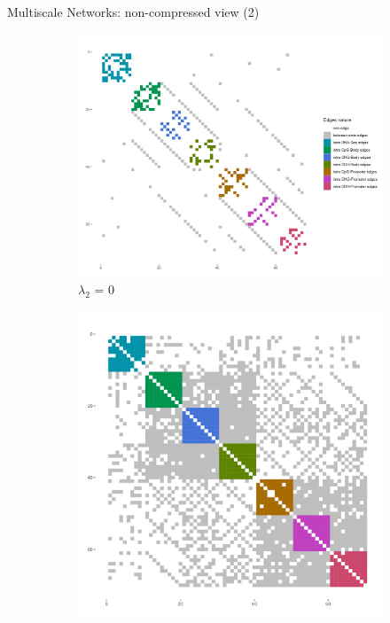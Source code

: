 \documentclass[11pt]{beamer}
\begin{document}
\begin{frame}{Multiscale Networks: non-compressed view (2)}
\begin{figure}
\centering
\begin{subfigure}{0.4\linewidth}
\centering
\includegraphics[scale = 0.14]{images/colored-adj_mat_mglasso_genot1_order_omic.png}
\caption{$\lambda_2$ = 0}
\end{subfigure}
\hfill
\begin{subfigure}{0.4\linewidth}
\centering
\includegraphics[scale = 0.14]{images/colored-adj_mat_mglasso_genot2_order_omic.png}

\end{subfigure}
\end{figure}
\end{frame}
\end{document}
